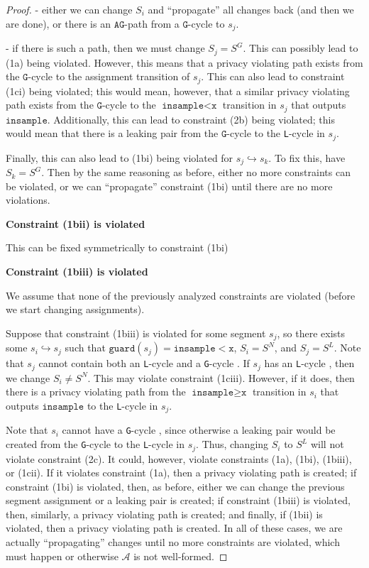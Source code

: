 \documentclass[12pt]{article}
\newcommand{\gguard}[1][x]{\texttt{insample}\geq \texttt{#1}}
\newcommand{\lguard}[1][x]{\texttt{insample} < \texttt{#1}}
\newcommand{\guard}{\texttt{guard}}
\newcommand{\gcycle}{\texttt{G}-cycle }
\newcommand{\lcycle}{\texttt{L}-cycle }
\theoremstyle{definition}
\begin{document}
\begin{proof}
	- either we can change $S_i$ and ``propagate'' all changes back (and then we are done), or there is an $\texttt{AG}$-path from a $\texttt{G}$-cycle to $s_j$. 
	 
	 - if there is such a path, then we must change $S_j = S^G$. This can possibly lead to (1a) being violated. However, this means that a privacy violating path exists from the $\texttt{G}$-cycle to the assignment transition of $s_j$. This can also lead to constraint (1ci) being violated; this would mean, however, that a similar privacy violating path exists from the $\texttt{G}$-cycle to the $\lguard$ transition in $s_j$ that outputs $\texttt{insample}$.
	 Additionally, this can lead to constraint (2b) being violated; this would mean that there is a leaking pair from the $\texttt{G}$-cycle to the \lcycle in $s_j$. 
	 
	 Finally, this can also lead to (1bi) being violated for $s_j \hookrightarrow s_k$. To fix this, have $S_k = S^G$. Then by the same reasoning as before, either no more constraints can be violated, or we can ``propagate'' constraint (1bi) until there are no more violations.

	\textbf{Constraint (1bii) is violated}

	This can be fixed symmetrically to constraint (1bi)

	\textbf{Constraint (1biii) is violated}

	We assume that none of the previously analyzed constraints are violated (before we start changing assignments).

	Suppose that constraint (1biii) is violated for some segment $s_j$, so there exists some $s_i\hookrightarrow s_j$ such that $\guard(s_j) = \lguard$, $S_i = S^N$, and $S_j = S^L$. Note that $s_j$ cannot contain both an \lcycle and a \gcycle. If $s_j$ has an \lcycle, then we change $S_i \neq S^N$. This may violate constraint (1ciii). However, if it does, then there is a privacy violating path from the $\gguard$ transition in $s_i$ that outputs $\texttt{insample}$ to the \lcycle in $s_j$. 
	
	Note that $s_i$ cannot have a \gcycle, since otherwise a leaking pair would be created from the \gcycle to the \lcycle in $s_j$. Thus, changing $S_i$ to $S^L$ will not violate constraint (2c). It could, however, violate constraints (1a), (1bi), (1biii), or (1cii). 
	If it violates constraint (1a), then a privacy violating path is created; if constraint (1bi) is violated, then, as before, either we can change the previous segment assignment or a leaking pair is created; if constraint (1biii) is violated, then, similarly, a privacy violating path is created; and finally, if (1bii) is violated, then a privacy violating path is created. 
	In all of these cases, we are actually ``propagating'' changes until no more constraints are violated, which must happen or otherwise $\mathcal{A}$ is not well-formed.


\end{proof}
\end{document}
